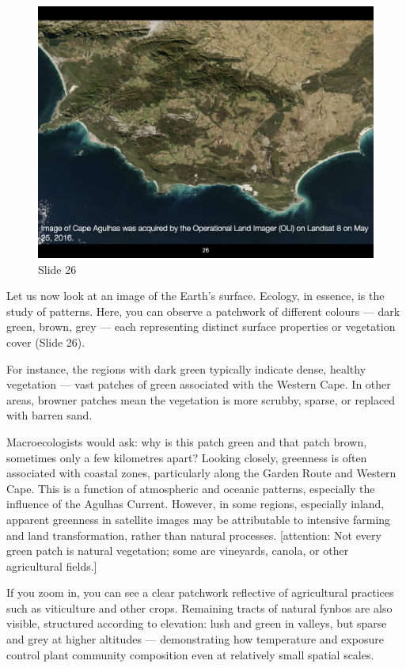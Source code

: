 \documentclass[
  10pt,
]{book}
\begin{document}
\begin{figure}[ht]
\centering
\includegraphics[width=0.8\linewidth]{../images/BDC334/BDC334-026.jpeg}
\caption*{Slide 26}
\end{figure}

Let us now look at an image of the Earth's surface. Ecology, in essence,
is the study of patterns. Here, you can observe a patchwork of different
colours --- dark green, brown, grey --- each representing distinct
surface properties or vegetation cover (Slide 26).

For instance, the regions with dark green typically indicate dense,
healthy vegetation --- vast patches of green associated with the Western
Cape. In other areas, browner patches mean the vegetation is more
scrubby, sparse, or replaced with barren sand.

Macroecologists would ask: why is this patch green and that patch brown,
sometimes only a few kilometres apart? Looking closely, greenness is
often associated with coastal zones, particularly along the Garden Route
and Western Cape. This is a function of atmospheric and oceanic
patterns, especially the influence of the Agulhas Current. However, in
some regions, especially inland, apparent greenness in satellite images
may be attributable to intensive farming and land transformation, rather
than natural processes. {[}attention: Not every green patch is natural
vegetation; some are vineyards, canola, or other agricultural fields.{]}

If you zoom in, you can see a clear patchwork reflective of agricultural
practices such as viticulture and other crops. Remaining tracts of
natural fynbos are also visible, structured according to elevation: lush
and green in valleys, but sparse and grey at higher altitudes ---
demonstrating how temperature and exposure control plant community
composition even at relatively small spatial scales.
\end{document}
